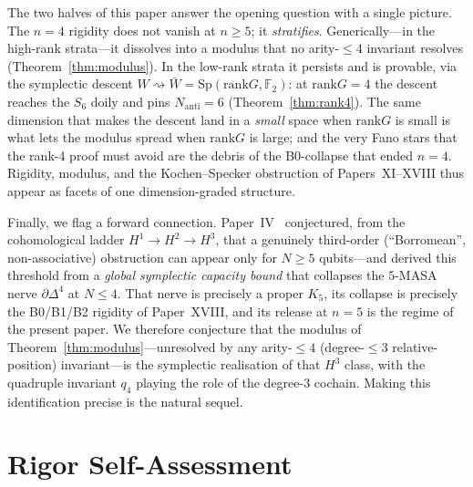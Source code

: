 \documentclass[11pt,a4paper]{article}
\theoremstyle{remark}
\newcommand{\Sp}{\mathrm{Sp}}
\newcommand{\rank}{\mathrm{rank}}
\newcommand{\Nanti}{N_{\mathrm{anti}}}
\begin{document}
The two halves of this paper answer the opening question with a single picture. The
$n=4$ rigidity does not vanish at $n\ge5$; it \emph{stratifies}. Generically---in the
high-rank strata---it dissolves into a modulus that no arity-$\le4$ invariant resolves
(Theorem~\ref{thm:modulus}). In the low-rank strata it persists and is provable, via
the symplectic descent $W\rightsquigarrow\bar W=\Sp(\rank G,\mathbb F_2)$: at
$\rank G=4$ the descent reaches the $S_6$ doily and pins $\Nanti=6$
(Theorem~\ref{thm:rank4}). The same dimension that makes the descent land in a
\emph{small} space when $\rank G$ is small is what lets the modulus spread when
$\rank G$ is large; and the very Fano stars that the rank-4 proof must avoid are the
debris of the B0-collapse that ended $n=4$. Rigidity, modulus, and the
Kochen--Specker obstruction of Papers~XI--XVIII thus appear as facets of one
dimension-graded structure.

Finally, we flag a forward connection. Paper~IV~\cite{PaperIV} conjectured, from the
cohomological ladder $H^1\to H^2\to H^3$, that a genuinely third-order
(``Borromean'', non-associative) obstruction can appear only for $N\ge5$ qubits---and
derived this threshold from a \emph{global symplectic capacity bound} that collapses
the $5$-MASA nerve $\partial\Delta^4$ at $N\le4$. That nerve is precisely a proper
$K_5$, its collapse is precisely the B0/B1/B2 rigidity of Paper~XVIII, and its release
at $n=5$ is the regime of the present paper. We therefore conjecture that the modulus
of Theorem~\ref{thm:modulus}---unresolved by any arity-$\le4$ (degree-$\le3$
relative-position) invariant---is the symplectic realisation of that $H^3$ class, with
the quadruple invariant $q_4$ playing the role of the degree-3 cochain. Making this
identification precise is the natural sequel.

\section{Rigor Self-Assessment}\label{sec:rigor}
\end{document}
